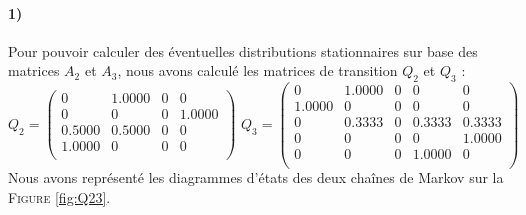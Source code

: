 \documentclass[a4paper,titlepage]{report}
\begin{document}
\paragraph{1)} Pour pouvoir calculer des éventuelles distributions stationnaires sur base des matrices $A_2$ et $A_3$, nous avons calculé les matrices de transition $Q_2$ et $Q_3$ : 
\[
Q_2 = 
\begin{pmatrix}
         0 &   1.0000  &       0  &       0 \\
         0 &        0  &       0  &  1.0000 \\
    0.5000 &   0.5000  &       0  &       0 \\
    1.0000 &        0  &       0  &       0 \\
\end{pmatrix}
\,\,
Q_3 = 
\begin{pmatrix}
        0  &   1.0000   &      0  &       0  &       0 \\
    1.0000 &        0   &      0  &       0  &       0 \\
         0 &   0.3333   &      0  &  0.3333  &  0.3333 \\
         0 &        0   &      0  &       0  &  1.0000 \\
         0 &        0   &      0  &  1.0000  &       0 \\
\end{pmatrix}
\]
Nous avons représenté les diagrammes d'états des deux chaînes de Markov sur la \textsc{Figure} \ref{fig:Q23}. 
\end{document}

